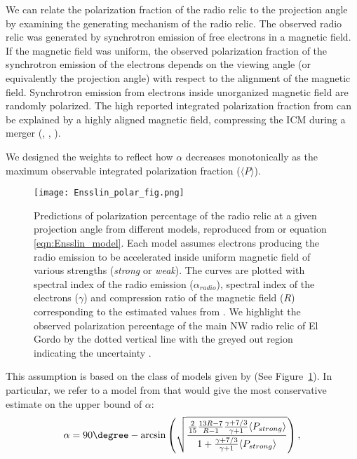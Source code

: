 We can relate the polarization fraction of the radio relic to the
projection angle by examining the
generating mechanism of the radio relic.
The observed radio relic was generated by synchrotron emission of free electrons in a
magnetic field. If the magnetic field was uniform, the observed
polarization fraction of the synchrotron emission of the electrons depends on the
viewing angle (or equivalently the projection angle) with respect to the
alignment of the magnetic field. Synchrotron emission from electrons inside unorganized magnetic field are
randomly polarized. The high reported integrated polarization fraction from
\citet{L13} can be explained by a highly aligned magnetic field,
compressing the ICM during a merger
(\citealt{E98}, \citealt{vanWeeren10}, \citealt{Feretti12}).
\par
We designed the weights to reflect how $\alpha$ decreases monotonically as the
maximum observable integrated polarization fraction ($\langle P \rangle$). 
\begin{figure}
	\texttt{[image: Ensslin\_polar\_fig.png]}
	\caption{Predictions of polarization percentage of the radio relic at a
		given projection angle from different models, reproduced from
		\citep{E98} or equation \ref{eqn:Ensslin_model}. Each model assumes electrons producing the radio emission
		to be accelerated inside uniform magnetic field of various strengths ({\it strong} or 
		{\it weak}). The curves are plotted with spectral index of the radio emission
		($\alpha_{radio}$), spectral index of the electrons ($\gamma$) and
		compression ratio of the magnetic field ($R$) corresponding to the
		estimated values from \citet{L13}.
		We highlight the observed polarization percentage of the main NW radio relic
		of El Gordo by the dotted vertical line with the greyed out region
		indicating the uncertainty \citep{L13}.\label{fig:Ensslin_fig}}
\end{figure}
This assumption is based on the class of models given by \cite{E98}(See
Figure~\ref{fig:Ensslin_fig}). In particular, we refer to a model from \cite{E98} 
that would give the most
conservative estimate on the upper bound of $\alpha$:
\begin{equation}
	\alpha = 90 \degree - \arcsin \left( \sqrt{\frac{\frac{2}{15} \frac{13R -
	7}{R - 1} \frac{\gamma + 7/3}{\gamma + 1} \langle P_{strong} \rangle}{1 +
		\frac{\gamma + 7/3}{\gamma +1} \langle P_{strong} \rangle
	}}\right),\label{eqn:Ensslin_model}
\end{equation}
